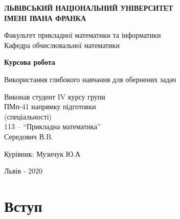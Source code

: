 \documentclass[14pt,a4paper]{extarticle}
\newcounter{e}
\newcounter{tabl}
\numberwithin{equation}{section}
\numberwithin{figure}{section}
\begin{document}
	\begin{titlepage}%
		\begin{center}
			{\textbf{ЛЬВІВСЬКИЙ НАЦІОНАЛЬНИЙ УНІВЕРСИТЕТ \\ ІМЕНІ ІВАНА ФРАНКА}}\par
			{Факультет прикладної математики та інформатики \\ Кафедра обчислювальної математики}\par
			\begin{center}
				
			\end{center}
			\vspace{25mm}
			{\textbf{\huge{Курсова робота}}}\par
			\vspace{5mm}
			{\large{Використання глибокого навчання для обернених задач}}\par
			\vspace{5mm}
			{}\par %
		\end{center}
		
		\vfill
		\vskip80pt
		
		\begin{flushleft}
			\hskip 8cm 
			Виконав студент IV курсу групи
			\\ \hskip8cm
			ПМп-41 напрямку підготовки 
			\\ \hskip8cm
			(спеціальності)
			\\ \hskip8cm
			113 -- ``Прикладна математика''
			\\ \hskip8cm
			Середович В.B.
		\end{flushleft}
		\begin{flushleft}
			\hskip8cm 
			Курівник: Музичук Ю.А
		\end{flushleft}
		
		\vfill
		
		\begin{center}
			\large
			Львів - 2020
		\end{center}
	\end{titlepage}

	\tableofcontents

	
	\newpage
	\thispagestyle{empty}
	\section*{Вступ}
	
\end{document}

